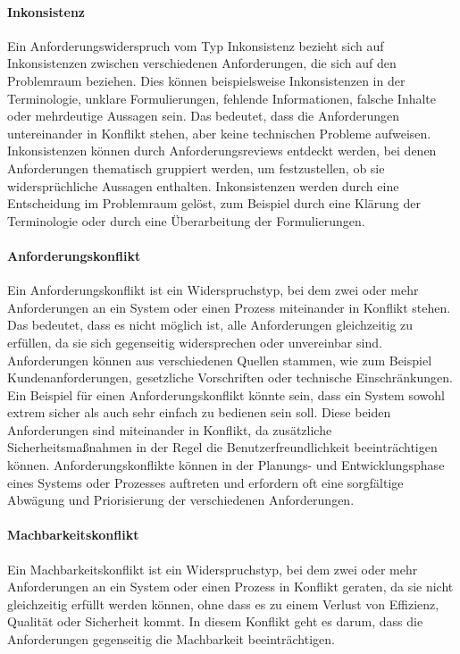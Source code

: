 \paragraph{Inkonsistenz}
Ein Anforderungswiderspruch vom Typ Inkonsistenz bezieht sich auf Inkonsistenzen zwischen verschiedenen Anforderungen,
die sich auf den Problemraum beziehen.
Dies können beispielsweise Inkonsistenzen in der Terminologie, unklare Formulierungen,
fehlende Informationen, falsche Inhalte oder mehrdeutige Aussagen sein.
Das bedeutet, dass die Anforderungen untereinander in Konflikt stehen, aber keine technischen Probleme aufweisen.
Inkonsistenzen können durch Anforderungsreviews entdeckt werden, bei denen Anforderungen thematisch gruppiert werden,
um festzustellen, ob sie widersprüchliche Aussagen enthalten.
Inkonsistenzen werden durch eine Entscheidung im Problemraum gelöst,
zum Beispiel durch eine Klärung der Terminologie oder durch eine Überarbeitung der Formulierungen.\autocite[vgl.][S.235]{Herrmann.2022}

\paragraph{Anforderungskonflikt}
Ein Anforderungskonflikt ist ein Widerspruchstyp,
bei dem zwei oder mehr Anforderungen an ein System oder einen Prozess miteinander in Konflikt stehen.
Das bedeutet, dass es nicht möglich ist, alle Anforderungen gleichzeitig zu erfüllen,
da sie sich gegenseitig widersprechen oder unvereinbar sind.
Anforderungen können aus verschiedenen Quellen stammen, wie zum Beispiel Kundenanforderungen,
gesetzliche Vorschriften oder technische Einschränkungen.
Ein Beispiel für einen Anforderungskonflikt könnte sein,
dass ein System sowohl extrem sicher als auch sehr einfach zu bedienen sein soll.
Diese beiden Anforderungen sind miteinander in Konflikt,
da zusätzliche Sicherheitsmaßnahmen in der Regel die Benutzerfreundlichkeit beeinträchtigen können.
Anforderungskonflikte können in der Planungs- und Entwicklungsphase eines Systems oder Prozesses auftreten
und erfordern oft eine sorgfältige Abwägung und Priorisierung der verschiedenen Anforderungen.\autocite[vgl.][S.235f]{Herrmann.2022}

\paragraph{Machbarkeitskonflikt}
Ein Machbarkeitskonflikt ist ein Widerspruchstyp,
bei dem zwei oder mehr Anforderungen an ein System oder einen Prozess in Konflikt geraten,
da sie nicht gleichzeitig erfüllt werden können,
ohne dass es zu einem Verlust von Effizienz, Qualität oder Sicherheit kommt.
In diesem Konflikt geht es darum, dass die Anforderungen gegenseitig die Machbarkeit beeinträchtigen.

